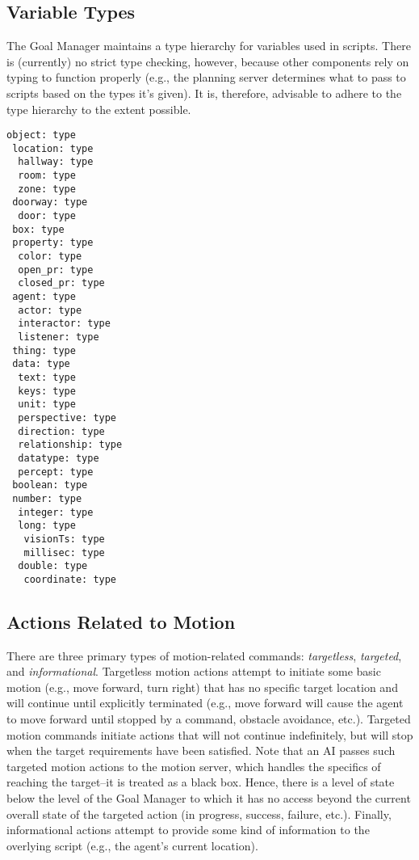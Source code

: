 \documentclass[11pt,letterpaper]{article}
\begin{document}
\subsection{Variable Types}

The Goal Manager maintains a type hierarchy for variables used in
scripts.  There is (currently) no strict type checking, however,
because other components rely on typing to function properly (e.g.,
the planning server determines what to pass to scripts based on the
types it's given).  It is, therefore, advisable to adhere to the type
hierarchy to the extent possible.

\begin{Verbatim}
object: type
 location: type
  hallway: type
  room: type
  zone: type
 doorway: type
  door: type
 box: type
 property: type
  color: type
  open_pr: type
  closed_pr: type
 agent: type
  actor: type
  interactor: type
  listener: type
 thing: type
 data: type
  text: type
  keys: type
  unit: type
  perspective: type
  direction: type
  relationship: type
  datatype: type
  percept: type
 boolean: type
 number: type
  integer: type
  long: type
   visionTs: type
   millisec: type
  double: type
   coordinate: type
\end{Verbatim}


\subsection{Actions Related to Motion}

There are three primary types of motion-related commands: {\em targetless},
{\em targeted}, and {\em informational}.  Targetless motion actions attempt
to initiate some basic motion (e.g., move forward, turn right) that
has no specific target location and will continue until explicitly
terminated (e.g., move forward will cause the agent to move forward until
stopped by a command, obstacle avoidance, etc.).  Targeted motion commands
initiate actions that will not continue indefinitely, but will stop when
the target requirements have been satisfied.  Note that an AI passes such
targeted motion actions to the motion server, which handles the specifics
of reaching the target--it is treated as a black box.  Hence, there is a
level of state below the level of the Goal Manager to which it has no
access beyond the current overall state of the targeted action (in
progress, success, failure, etc.).  Finally, informational actions attempt
to provide some kind of information to the overlying script (e.g., the
agent's current location).
\end{document}

